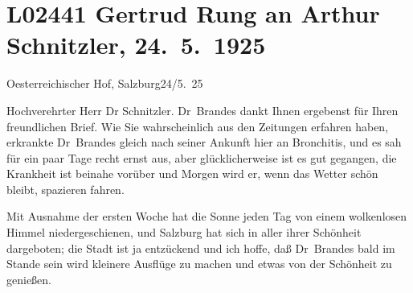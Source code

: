 

\section[Gertrud Rung an Arthur Schnitzler, 24. 5. 1925]{L02441 Gertrud Rung an Arthur Schnitzler, 24. 5. 1925}
\nopagebreak{}
\rehead{ }\normalsize\beginnumbering{}
\toendnotes[C]{\smallbreak\pagebreak[2]}
\pstart
           \raggedleft{}{\pb}Oesterreichischer Hof, Salzburg24/5. 25\pend
           
\pstart{}Hochverehrter Herr Dr Schnitzler.\pend\vspace{0.5em}
\pstart
           Dr Brandes dankt Ihnen ergebenst für Ihren
               freundlichen Brief. Wie Sie wahrscheinlich aus den Zeitungen erfahren haben,
               erkrankte Dr Brandes gleich nach seiner
               Ankunft hier an Bronchitis, und es sah für ein paar Tage recht ernst aus, aber
               glücklicherweise ist es gut gegangen, die Krankheit ist beinahe vorüber und Morgen
                  {\pb}wird er, wenn das Wetter schön
               bleibt, spazieren fahren.\pend
           
\pstart
           Mit Ausnahme der ersten Woche hat die Sonne jeden Tag von einem wolkenlosen Himmel
               niedergeschienen, und Salzburg hat sich in aller
               ihrer Schönheit dargeboten; die Stadt ist ja entzückend und ich hoffe, daß Dr Brandes bald im Stande sein wird kleinere
               Ausflüge zu machen und etwas von der Schönheit zu genießen.\pend
           
